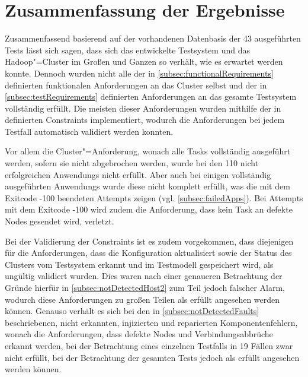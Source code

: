 \section{Zusammenfassung der Ergebnisse}
\label{sec:evaluationResults}

Zusammenfassend basierend auf der vorhandenen Datenbasis der 43 ausgeführten \glspl{Test} lässt sich sagen, dass sich das entwickelte Testsystem und das Hadoop"=Cluster im Großen und Ganzen so verhält, wie es erwartet werden konnte.
Dennoch wurden nicht alle der in \cref{subsec:functionalRequirements} definierten funktionalen Anforderungen an das Cluster selbst und der in \cref{subsec:testRequirements} definierten Anforderungen an das gesamte Testsystem vollständig erfüllt.
Die meisten dieser Anforderungen wurden mithilfe der in  definierten Constraints implementiert, wodurch die Anforderungen bei jedem \gls{Testfall} automatisch validiert werden konnten.

Vor allem die Cluster"=Anforderung, wonach alle Tasks vollständig ausgeführt werden, sofern sie nicht abgebrochen werden, wurde bei den 110 nicht erfolgreichen \glspl{Anwendung} nicht erfüllt.
Aber auch bei einigen vollständig ausgeführten \glspl{Anwendung} wurde diese nicht komplett erfüllt, was die mit dem Exitcode -100 beendeten \glspl{Attempt} zeigen (vgl. \cref{subsec:failedApps}).
Bei \glspl{Attempt} mit dem Exitcode -100 wird zudem die Anforderung, dass kein Task an defekte Nodes gesendet wird, verletzt.

Bei der Validierung der Constraints ist es zudem vorgekommen, dass diejenigen für die Anforderungen, dass die Konfiguration aktualisiert sowie der Status des Clusters vom Testsystem erkannt und im Testmodell gespeichert wird, als ungültig validiert wurden.
Dies waren nach einer genaueren Betrachtung der Gründe hierfür in \cref{subsec:notDetectedHost2} zum Teil jedoch falscher Alarm, wodurch diese Anforderungen zu großen Teilen als erfüllt angesehen werden können.
Genauso verhält es sich bei den in \cref{subsec:notDetectedFaults} beschriebenen, nicht erkannten, injizierten und reparierten Komponentenfehlern, wonach die Anforderungen, dass defekte Nodes und Verbindungsabbrüche erkannt werden, bei der Betrachtung eines einzelnen Testfalls in 19 Fällen zwar nicht erfüllt, bei der Betrachtung der gesamten \glspl{Test} jedoch als erfüllt angesehen werden können.

